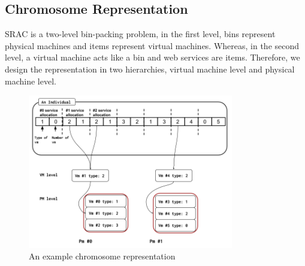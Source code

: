 \subsection{Chromosome Representation}
SRAC is a two-level bin-packing problem, in the first level, 
bins represent physical machines and items represent virtual machines. Whereas, in the second level, a virtual machine acts like a bin and web services are items. 
Therefore, we design the representation in two hierarchies, virtual machine level and physical machine level. 

\begin{figure}
\centering
  \includegraphics[width=0.8\textwidth]{pics/preliminary/cec.png}
  \caption{An example chromosome representation}
  \label{fig:rep}
\end{figure}

